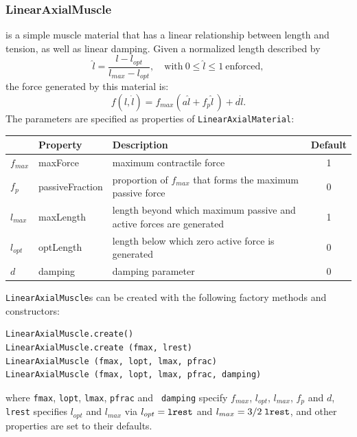 \subsubsection{LinearAxialMuscle}

is a simple muscle material that has a linear relationship between
length and tension, as well as linear damping. Given a normalized
length described by
%
\begin{equation}
\hat l= \frac{l - l_{opt}}{l_{max} - l_{opt}}, 
\quad \mathrm{with}~ 0 \le \hat l \le 1~\mathrm{enforced},
\end{equation}
%
the force generated by this material is:
%
\begin{equation}
f(l, \dot l) = f_{max} \left( a \hat l +  f_{p} \hat l \, \right) + d \dot l.
\label{LinearAxialMaterial:eqn}
\end{equation}
%
The parameters are specified as properties of {\tt LinearAxialMaterial}:

\begin{center}
\begin{tabular}{|l|l|l|c|} \hline
& Property & Description & Default \\
\hline
$f_{max}$ & {\sf maxForce} & maximum contractile force & 1 \\
$f_{p}$ & {\sf passiveFraction} & 
proportion of $f_{max}$ that forms the maximum passive force & 0 \\
$l_{max}$ & {\sf maxLength} &
length beyond which maximum passive and active forces are generated & 1 \\
$l_{opt}$ & {\sf optLength} &
length below which zero active force is generated & 0 \\
$d$ & {\sf damping} & damping parameter & 0 \\
\hline
\end{tabular}
\end{center}

{\tt LinearAxialMuscle}s can be created with the following factory
methods and constructors:
\begin{lstlisting}[]
LinearAxialMuscle.create()
LinearAxialMuscle.create (fmax, lrest)
LinearAxialMuscle (fmax, lopt, lmax, pfrac)
LinearAxialMuscle (fmax, lopt, lmax, pfrac, damping)
\end{lstlisting}
%
where {\tt fmax}, {\tt lopt}, {\tt lmax}, {\tt pfrac} and {\tt
damping} specify $f_{max}$, $l_{opt}$, $l_{max}$, $f_{p}$ and $d$,
{\tt lrest} specifies $l_{opt}$ and $l_{max}$ via
$l_{opt} = \mathrm{\tt lrest}$ and
$l_{max} = 3/2 \; \mathrm{\tt lrest}$, and other properties are set to
their defaults.

